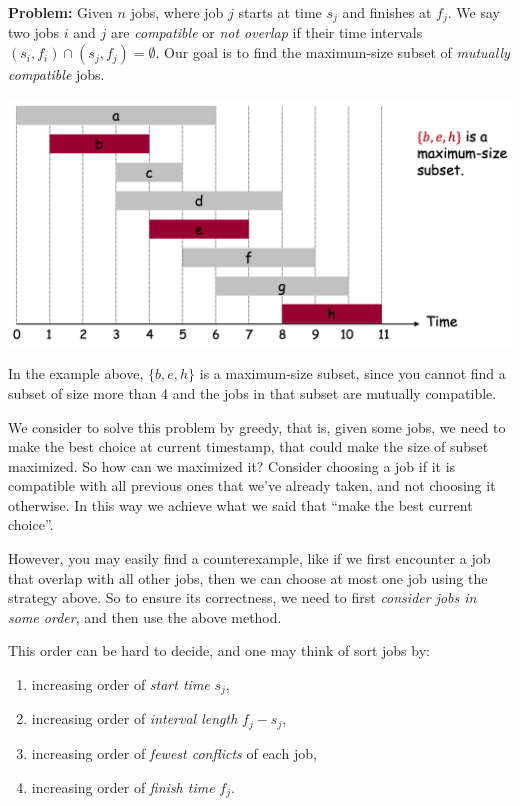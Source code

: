 \begin{spacing}{1.3}
    {\bf Problem:} Given $n$ jobs, where job $j$ starts at time $s_j$ and finishes at $f_j$.
    We say two jobs $i$ and $j$ are {\it compatible} or {\it not overlap} if their time intervals 
    $(s_i, f_i)\cap (s_j, f_j) = \emptyset$. Our goal is to find the maximum-size subset
    of {\it mutually compatible} jobs.
    \begin{center}
        \includegraphics[scale=0.35]{images/07-interval-example.png}
    \end{center}
    In the example above, $\{b,e,h\}$ is a maximum-size subset, since you cannot find 
    a subset of size more than 4 and the jobs in that subset are mutually compatible.

    We consider to solve this problem by greedy, that is, given some jobs, we need 
    to make the best choice at current timestamp, that could make the size of subset maximized.
    So how can we maximized it? Consider choosing a job if it is compatible with all previous ones 
    that we've already taken, and not choosing it otherwise. In this way we achieve what we said that 
    ``make the best current choice''.

    However, you may easily find a counterexample, like if we first encounter a job that overlap 
    with all other jobs, then we can choose at most one job using the strategy above. So to ensure 
    its correctness, we need to first {\it consider jobs in some order}, and then use the above method.

    This order can be hard to decide, and one may think of sort jobs by:
    \begin{enumerate}
        \item increasing order of {\it start time} $s_j$,
        \item increasing order of {\it interval length} $f_j-s_j$,
        \item increasing order of {\it fewest conflicts} of each job,
        \item increasing order of {\it finish time} $f_j$.
    \end{enumerate}


\end{spacing}
